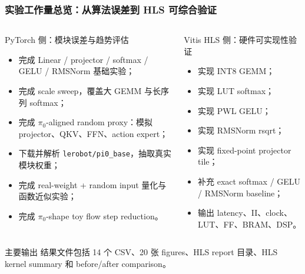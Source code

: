 \documentclass[10pt, aspectratio=169]{beamer}
\newcommand{\piZero}{\texorpdfstring{$\pi_0$}{pi0}\xspace}
\begin{document}
\begin{frame}
  \frametitle{实验工作量总览：从算法误差到 HLS 可综合验证}
  \small
  \begin{columns}[T,onlytextwidth]
    \begin{block}{PyTorch 侧：模块误差与趋势评估}
      \scriptsize
      \begin{itemize}
        \item 完成 Linear / projector / softmax / GELU / RMSNorm 基础实验；
        \item 完成 scale sweep，覆盖大 GEMM 与长序列 softmax；
        \item 完成 \piZero-aligned random proxy：模拟 projector、QKV、FFN、action expert；
        \item 下载并解析 \texttt{lerobot/pi0\_base}，抽取真实模块权重；
        \item 完成 real-weight + random input 量化与函数近似实验；
        \item 完成 \piZero-shape toy flow step reduction。
      \end{itemize}
    \end{block}

    \begin{alertblock}{Vitis HLS 侧：硬件可实现性验证}
      \scriptsize
      \begin{itemize}
        \item 实现 INT8 GEMM；
        \item 实现 LUT softmax；
        \item 实现 PWL GELU；
        \item 实现 RMSNorm rsqrt；
        \item 实现 fixed-point projector tile；
        \item 补充 exact softmax / GELU / RMSNorm baseline；
        \item 输出 latency、II、clock、LUT、FF、BRAM、DSP。
      \end{itemize}
    \end{alertblock}
  \end{columns}

  \vspace{3pt}
  \begin{exampleblock}{主要输出}
    结果文件包括 14 个 CSV、20 张 figures、HLS report 目录、HLS kernel summary 和 before/after comparison。
  \end{exampleblock}
\end{frame}
\end{document}
